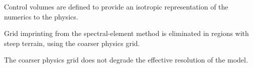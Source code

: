\documentclass{agujournal}
\begin{document}





\begin{keypoints}
\item Control volumes are defined to provide an isotropic representation of the numerics to the physics.
\item Grid imprinting from the spectral-element method is eliminated in regions with steep terrain, using the coarser physics grid.
\item The coarser physics grid does not degrade the effective resolution of the model.
\end{keypoints}

%
%

\end{document}
